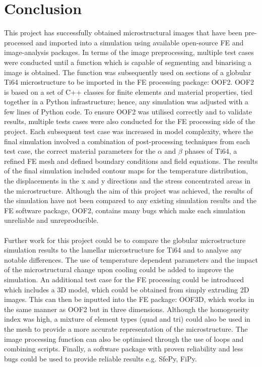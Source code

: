 \documentclass[report.tex]{subfiles}
\begin{document}
\section{Conclusion}

\noindent This project has successfully obtained microstructural images that have been pre-processed and imported into a simulation using available open-source FE and image-analysis packages. In terms of the image preprocessing, multiple test cases were conducted until a function which is capable of segmenting and binarising a image is obtained. The function was subsequently used on sections of a globular Ti64 microstructure to be imported in the FE processing package: OOF2. OOF2 is based on a set of C++ classes for finite elements and material properties, tied together in a Python infrastructure; hence, any simulation was adjusted with a few lines of Python code. To ensure OOF2 was utilised correctly and to validate results, multiple tests cases were also conducted for the FE processing side of the project. Each subsequent test case was increased in model complexity, where the final simulation involved a combination of post-processing techniques from each test case, the correct material parameters for the $\alpha$ and $\beta$ phases of Ti64, a refined FE mesh and defined boundary conditions and  field equations. The results of the final simulation included contour maps for the temperature distribution, the displacements in the x and y directions and the stress concentrated areas in the microstructure. Although the aim of this  project was achieved, the results of the simulation have not been compared to any existing simulation results and the FE software package, OOF2, contains many bugs which make each simulation unreliable and unreproducible. \\
\\ 
Further work for this project could be to compare the globular microstructure simulation results to the lamellar microstructure for Ti64 and to analyse any notable differences. The use of temperature dependent parameters and the impact of the microstructural change upon cooling could be added to improve the simulation.  An additional test case for the FE processing could be introduced which includes a 3D model, which could be obtained from simply extruding 2D images. This can then be inputted into the FE package: OOF3D, which works in the same manner as OOF2 but in three dimensions. Although the homogeneity index was high, a mixture of element types (quad and tri) could also be used in the mesh to provide a more accurate representation of the microstructure. The image processing function can also be optimised through the use of loops and combining scripts. Finally, a software package with proven reliability and less bugs could be used to provide reliable results e.g. SfePy, FiPy.
 
\end{document}
